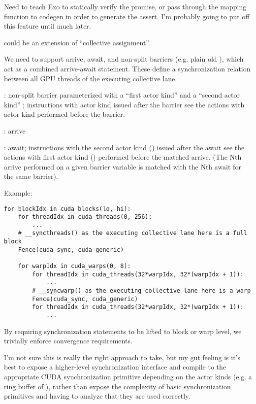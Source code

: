  Need to teach Exo to statically verify the promise, or pass through the mapping function to codegen in order to generate the assert.
I'm probably going to put off this feature until much later.

 could be an extension of ``collective assignment''.

\filbreak
{} We need to support arrive, await, and non-split barriers (e.g. plain old ), which act as a combined arrive-await statement.
These define a synchronization relation between all GPU threads of the executing collective lane.

: non-split barrier parameterized with a ``first actor kind''  and a ``second actor kind'' ; instructions with actor kind  issued after the barrier see the actions with actor kind  performed before the barrier.

: arrive

: await; instructions with the second actor kind () issued after the await see the actions with first actor kind () performed before the matched arrive.
(The Nth arrive performed on a given barrier variable is matched with the Nth await for the same barrier).

\filbreak
Example:

{\color{lightttColor}
\begin{verbatim}
for blockIdx in cuda_blocks(lo, hi):
    for threadIdx in cuda_threads(0, 256):
        ...
    # __syncthreads() as the executing collective lane here is a full block
    Fence(cuda_sync, cuda_generic)

    for warpIdx in cuda_warps(0, 8):
        for threadIdx in cuda_threads(32*warpIdx, 32*(warpIdx + 1)):
            ...
        # __syncwarp() as the executing collective lane here is a warp
        Fence(cuda_sync, cuda_generic)
        for threadIdx in cuda_threads(32*warpIdx, 32*(warpIdx + 1)):
            ...
\end{verbatim}
}

By requiring synchronization statements to be lifted to block or warp level, we trivially enforce convergence requirements.

\filbreak
I'm not sure this is really the right approach to take, but my gut feeling is it's best to expose a higher-level synchronization interface and compile to the appropriate CUDA synchronization primitive depending on the actor kinds (e.g. a ring buffer of \mbarrier), rather than expose the complexity of basic synchronization primitives and having to analyze that they are used correctly.


